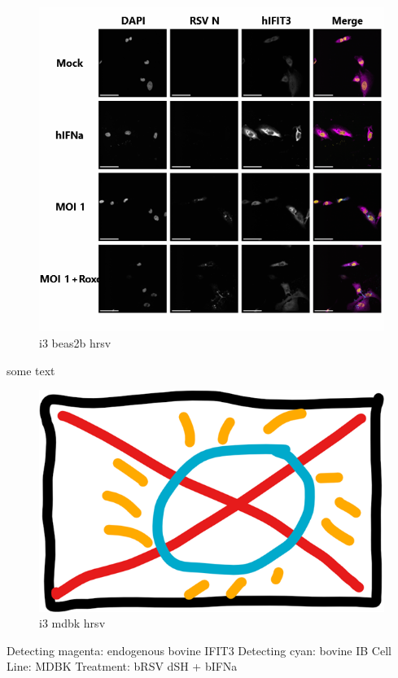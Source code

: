 \begin{figure}
    \centering
    \includegraphics[width=1\linewidth]{08. Chapter 3/Figs/04. IFIT3/03. beas2b hrsv.png}
    \caption[i3 beas2b hrsv]{i3 beas2b hrsv}
    \label{i3 beas2b hrsv}
\end{figure}

 \label{bIFIT3 Localisation During h/bRSV Infection}
some text

\begin{figure}
    \centering
    \includegraphics[width=0.5\linewidth]{06. Chapter 1//Figs/00. placeholder.png}
    \caption[i3 mdbk hrsv]{i3 mdbk hrsv}
    \label{i3 mdbk hrsv}
\end{figure}

Detecting magenta: endogenous bovine IFIT3 \newline
Detecting cyan: bovine IB \newline
Cell Line: MDBK \newline
Treatment: bRSV dSH + bIFNa \newline

